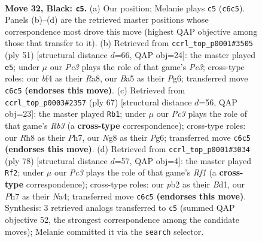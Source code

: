 \documentclass[11pt]{article}
\begin{document}
\clearpage

\begin{figure}[p]\centering
\begin{subfigure}{0.46\textwidth}\centering
\resizebox{\linewidth}{!}{%
\newchessgame
\chessboard[
  setfen={r5nr/p4k1p/2p5/b7/5B2/P2B3P/RPP2KP1/1R6 b - - 2 32},
  showmover=false,
  pgfstyle=straightmove, color=movearrow, markmove={c6-c5}
]}
\caption{}
\end{subfigure}\hfill
\begin{subfigure}{0.46\textwidth}\centering
\resizebox{\linewidth}{!}{%
\newchessgame
\chessboard[
  setfen={r5k1/2p5/4pbpp/p7/P7/R1P2PB1/1P5P/6K1 b - - 1 26},
  showmover=false,
  pgfstyle=straightmove, color=movearrow, markmove={e6-e5}
]}
\caption{}
\end{subfigure}
\\[4pt]
\begin{subfigure}{0.46\textwidth}\centering
\resizebox{\linewidth}{!}{%
\newchessgame
\chessboard[
  setfen={8/2r1pk1p/1r4p1/p1n5/2P2P2/4R1P1/P2R3P/5BK1 b - - 0 34},
  showmover=false,
  pgfstyle=straightmove, color=movearrow, markmove={b6-b1}
]}
\caption{}
\end{subfigure}\hfill
\begin{subfigure}{0.46\textwidth}\centering
\resizebox{\linewidth}{!}{%
\newchessgame
\chessboard[
  setfen={1r6/4kp1p/2p3pP/3p1b2/Nr3P2/8/6P1/R1KB1R2 w - - 6 40},
  showmover=false,
  pgfstyle=straightmove, color=movearrow, markmove={f1-f2}
]}
\caption{}
\end{subfigure}
\caption{\textbf{Move 32, Black: \texttt{c5}.} (a) Our position; Melanie plays \texttt{c5} (\texttt{c6c5}). Panels (b)--(d) are the retrieved master positions whose correspondence most drove this move (highest QAP objective among those that transfer to it). (b) Retrieved from \texttt{ccrl\_top\_p0001\#3505} (ply 51) [structural distance $d$=66, QAP obj=24]: the master played \texttt{e5}; under $\mu$ our \emph{Pc3} plays the role of that game's \emph{Pe3}; cross-type roles: our \emph{b}f4 as their \emph{R}a8, our \emph{B}a5 as their \emph{P}g6; transferred move \texttt{c6c5} \textbf{(endorses this move)}. (c) Retrieved from \texttt{ccrl\_top\_p0003\#2357} (ply 67) [structural distance $d$=56, QAP obj=23]: the master played \texttt{Rb1}; under $\mu$ our \emph{Pc3} plays the role of that game's \emph{Rb3} (a \textbf{cross-type} correspondence); cross-type roles: our \emph{R}h8 as their \emph{P}h7, our \emph{N}g8 as their \emph{P}g6; transferred move \texttt{c6c5} \textbf{(endorses this move)}. (d) Retrieved from \texttt{ccrl\_top\_p0001\#3034} (ply 78) [structural distance $d$=57, QAP obj=4]: the master played \texttt{Rf2}; under $\mu$ our \emph{Pc3} plays the role of that game's \emph{Rf1} (a \textbf{cross-type} correspondence); cross-type roles: our \emph{p}b2 as their \emph{B}d1, our \emph{P}h7 as their \emph{N}a4; transferred move \texttt{c6c5} \textbf{(endorses this move)}. Synthesis: 3 retrieved analogs transferred to \texttt{c5} (summed QAP objective 52, the strongest correspondence among the candidate moves); Melanie committed it via the \texttt{search} selector.}
\label{fig:thought-m63}
\end{figure}
\end{document}
